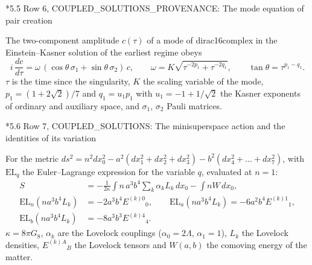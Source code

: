 \documentclass[10pt,a4paper]{article}
\makeatletter
\renewcommand\subsection{\@startsection{subsection}{2}{\z@}{-3.25ex\@plus -1ex \@minus -.2ex}{1.5ex \@plus .2ex}{\normalfont\large\bfseries\raggedright}}
\makeatother
\begin{document}
\subsection*{5.5 Row 6, COUPLED\_SOLUTIONS\_PROVENANCE: The mode equation of pair creation}
The two-component amplitude $c(\tau)$ of a mode of dirac16complex in the Einstein–Kasner solution of the earliest regime obeys
\begin{equation*}
i\,\frac{dc}{d\tau}=\omega\,(\cos\theta\,\sigma_1+\sin\theta\,\sigma_2)\,c,\qquad \omega=K\sqrt{\tau^{-2p_1}+\tau^{-2q_1}},\qquad \tan\theta=\tau^{p_1-q_1} .
\end{equation*}
$\tau$ is the time since the singularity, $K$ the scaling variable of the mode, $p_1=(1+2\sqrt2)/7$ and $q_1=u_1p_1$ with $u_1=-1+1/\sqrt2$ the Kasner exponents of ordinary and auxiliary space, and $\sigma_1$, $\sigma_2$ Pauli matrices.

\subsection*{5.6 Row 7, COUPLED\_SOLUTIONS: The minisuperspace action and the identities of its variation}
For the metric $ds^2=n^2dx_0^2-a^2(dx_1^2+dx_2^2+dx_3^2)-b^2(dx_4^2+\dots+dx_7^2)$, with $\mathrm{EL}_q$ the Euler–Lagrange expression for the variable $q$, evaluated at $n=1$:
\begin{align*}
S&=-\frac1{2\kappa}\int n\,a^3b^4\sum_k\alpha_kL_k\,dx_0-\int nW\,dx_0, \\
\mathrm{EL}_n(na^3b^4L_k)&=-2a^3b^4E^{(k)0}{}_0,\qquad \mathrm{EL}_a(na^3b^4L_k)=-6a^2b^4E^{(k)1}{}_1, \\
\mathrm{EL}_b(na^3b^4L_k)&=-8a^3b^3E^{(k)4}{}_4 .
\end{align*}
$\kappa=8\pi G_8$, $\alpha_k$ are the Lovelock couplings ($\alpha_0=2\Lambda$, $\alpha_1=1$), $L_k$ the Lovelock densities, $E^{(k)A}{}_B$ the Lovelock tensors and $W(a,b)$ the comoving energy of the matter.
\end{document}
